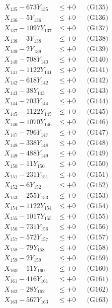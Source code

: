 \documentclass[a4paper,10pt]{article}
\begin{document}
{\begin{align}
X_{135} - 673Y_{135} &\leq +0 && \text{(G135)} \\
X_{136} - 5Y_{136} &\leq +0 && \text{(G136)} \\
X_{137} - 1097Y_{137} &\leq +0 && \text{(G137)} \\
X_{138} - 3Y_{138} &\leq +0 && \text{(G138)} \\
X_{139} - 2Y_{139} &\leq +0 && \text{(G139)} \\
X_{140} - 708Y_{140} &\leq +0 && \text{(G140)} \\
\allowbreak
X_{141} - 1122Y_{141} &\leq +0 && \text{(G141)} \\
X_{142} - 618Y_{142} &\leq +0 && \text{(G142)} \\
X_{143} - 38Y_{143} &\leq +0 && \text{(G143)} \\
X_{144} - 703Y_{144} &\leq +0 && \text{(G144)} \\
X_{145} - 1122Y_{145} &\leq +0 && \text{(G145)} \\
X_{146} - 1070Y_{146} &\leq +0 && \text{(G146)} \\
X_{147} - 796Y_{147} &\leq +0 && \text{(G147)} \\
X_{148} - 338Y_{148} &\leq +0 && \text{(G148)} \\
X_{149} - 488Y_{149} &\leq +0 && \text{(G149)} \\
X_{150} - 11Y_{150} &\leq +0 && \text{(G150)} \\
\allowbreak
X_{151} - 231Y_{151} &\leq +0 && \text{(G151)} \\
X_{152} - 6Y_{152} &\leq +0 && \text{(G152)} \\
X_{153} - 255Y_{153} &\leq +0 && \text{(G153)} \\
X_{154} - 1122Y_{154} &\leq +0 && \text{(G154)} \\
X_{155} - 1017Y_{155} &\leq +0 && \text{(G155)} \\
X_{156} - 731Y_{156} &\leq +0 && \text{(G156)} \\
X_{157} - 572Y_{157} &\leq +0 && \text{(G157)} \\
X_{158} - 79Y_{158} &\leq +0 && \text{(G158)} \\
X_{159} - 2Y_{159} &\leq +0 && \text{(G159)} \\
X_{160} - 11Y_{160} &\leq +0 && \text{(G160)} \\
\allowbreak
X_{161} - 416Y_{161} &\leq +0 && \text{(G161)} \\
X_{162} - 28Y_{162} &\leq +0 && \text{(G162)} \\
X_{163} - 567Y_{163} &\leq +0 && \text{(G163)} \\

\end{align}}
\end{document}
